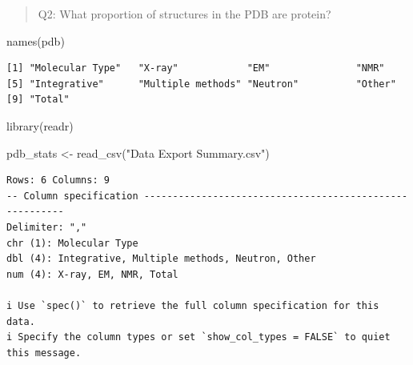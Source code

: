 \documentclass[
  letterpaper,
  DIV=11,
  numbers=noendperiod]{scrartcl}
\newenvironment{Shaded}{\begin{snugshade}}{\end{snugshade}}
\newcommand{\AttributeTok}[1]{\textcolor[rgb]{0.40,0.45,0.13}{#1}}
\newcommand{\FunctionTok}[1]{\textcolor[rgb]{0.28,0.35,0.67}{#1}}
\newcommand{\NormalTok}[1]{\textcolor[rgb]{0.00,0.23,0.31}{#1}}
\newcommand{\OtherTok}[1]{\textcolor[rgb]{0.00,0.23,0.31}{#1}}
\newcommand{\SpecialCharTok}[1]{\textcolor[rgb]{0.37,0.37,0.37}{#1}}
\newcommand{\StringTok}[1]{\textcolor[rgb]{0.13,0.47,0.30}{#1}}
\begin{document}
\begin{quote}
Q2: What proportion of structures in the PDB are protein?
\end{quote}

\begin{Shaded}
\begin{Highlighting}[]
\FunctionTok{names}\NormalTok{(pdb)}
\end{Highlighting}
\end{Shaded}

\begin{verbatim}
[1] "Molecular Type"   "X-ray"            "EM"               "NMR"             
[5] "Integrative"      "Multiple methods" "Neutron"          "Other"           
[9] "Total"           
\end{verbatim}

\begin{Shaded}
\begin{Highlighting}[]
\FunctionTok{library}\NormalTok{(readr)}

\NormalTok{pdb\_stats }\OtherTok{\textless{}{-}} \FunctionTok{read\_csv}\NormalTok{(}\StringTok{"Data Export Summary.csv"}\NormalTok{)}
\end{Highlighting}
\end{Shaded}

\begin{verbatim}
Rows: 6 Columns: 9
-- Column specification --------------------------------------------------------
Delimiter: ","
chr (1): Molecular Type
dbl (4): Integrative, Multiple methods, Neutron, Other
num (4): X-ray, EM, NMR, Total

i Use `spec()` to retrieve the full column specification for this data.
i Specify the column types or set `show_col_types = FALSE` to quiet this message.
\end{verbatim}

\begin{Shaded}
\end{Shaded}
\end{document}
